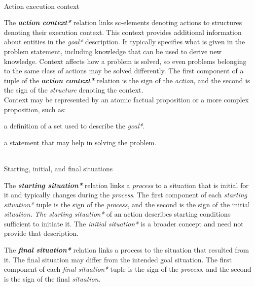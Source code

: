 \begin{frame}{\\Action execution context}
\topline
\justifying

 \vspace{10mm}
    The \textbf{\textit{action context*}} relation links sc-elements denoting actions to structures denoting their execution context. This context provides additional information about entities in the \textit{goal*} description. It typically specifies what is given in the problem statement, including knowledge that can be used to derive new knowledge. Context affects how a problem is solved, so even problems belonging to the same class of actions may be solved differently.
    The first component of a tuple of the \textbf{\textit{action context*}} relation is the sign of the \textit{action}, and the second is the sign of the \textit{structure} denoting the context.\\
    Context may be represented by an atomic factual proposition or a more complex proposition, such as:
    \begin{textitemize}
        \item a definition of a set used to describe the \textit{goal*}.
        \item a statement that may help in solving the problem.
    \end{textitemize}
\end{frame}

\begin{frame}{\\Starting, initial, and final situations}
\topline
\justifying
\vspace{10mm}

	The \textit{\textbf{starting situation*}} relation links a \textit{process} to a situation that is initial for it and typically changes during the \textit{process}.
    The first component of each \textit{starting situation*} tuple is the sign of the \textit{process}, and the second is the sign of the initial \textit{situation.}
    \textit{The starting situation*} of an action describes starting conditions sufficient to initiate it. The \textit{initial situation*} is a broader concept and need not provide that description.

    \bigskip

    The \textit{\textbf{final situation*}} relation links a process to the situation that resulted from it. The final situation may differ from the intended goal situation.
The first component of each \textit{final situation*} tuple is the sign of the \textit{process}, and the second is the sign of the final \textit{situation}.
\end{frame}

